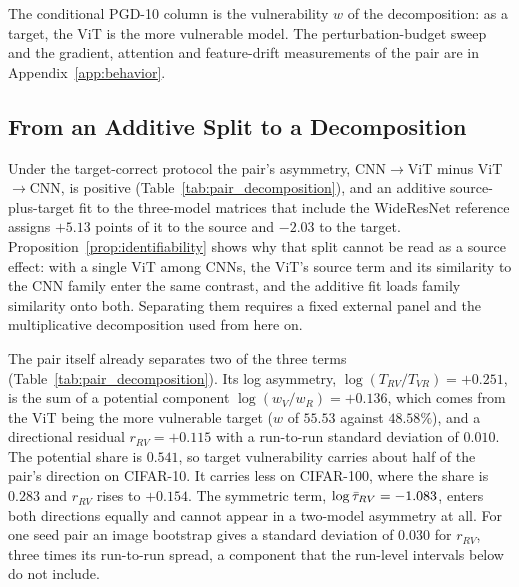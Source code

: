 The conditional PGD-10 column is the vulnerability $w$ of the decomposition: as a target, the ViT is the more vulnerable model. The perturbation-budget sweep and the gradient, attention and feature-drift measurements of the pair are in Appendix~\ref{app:behavior}.

\subsection{From an Additive Split to a Decomposition}
\label{subsec:pair_decomposition}

Under the target-correct protocol the pair's asymmetry, CNN$\rightarrow$ViT minus ViT$\rightarrow$CNN, is positive (Table~\ref{tab:pair_decomposition}), and an additive source-plus-target fit to the three-model matrices that include the WideResNet reference assigns $+5.13$ points of it to the source and $-2.03$ to the target. Proposition~\ref{prop:identifiability} shows why that split cannot be read as a source effect: with a single ViT among CNNs, the ViT's source term and its similarity to the CNN family enter the same contrast, and the additive fit loads family similarity onto both. Separating them requires a fixed external panel and the multiplicative decomposition used from here on.

The pair itself already separates two of the three terms (Table~\ref{tab:pair_decomposition}). Its log asymmetry, $\log(T_{RV}/T_{VR}) = +0.251$, is the sum of a potential component $\log(w_V/w_R) = +0.136$, which comes from the ViT being the more vulnerable target ($w$ of $55.53$ against $48.58\%$), and a directional residual $r_{RV} = +0.115$ with a run-to-run standard deviation of $0.010$. The potential share is $0.541$, so target vulnerability carries about half of the pair's direction on CIFAR-10. It carries less on CIFAR-100, where the share is $0.283$ and $r_{RV}$ rises to $+0.154$. The symmetric term, $\log\bar{\tau}_{RV} = -1.083$, enters both directions equally and cannot appear in a two-model asymmetry at all. For one seed pair an image bootstrap gives a standard deviation of $0.030$ for $r_{RV}$, three times its run-to-run spread, a component that the run-level intervals below do not include.

